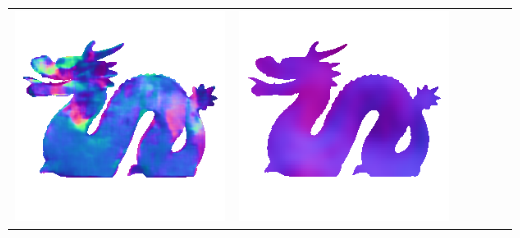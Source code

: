 \begin{center}
\begin{tabularx}{\linewidth}{@{}Y@{}Y@{}Y@{}Y@{}Y@{}Y@{}}
\includegraphics[width=\linewidth]{semisynthetic/20160617_21_marrnet_out.png} &
\includegraphics[width=\linewidth]{semisynthetic/20160617_21_ef_out.png} \\

\end{tabularx}
\end{center}
